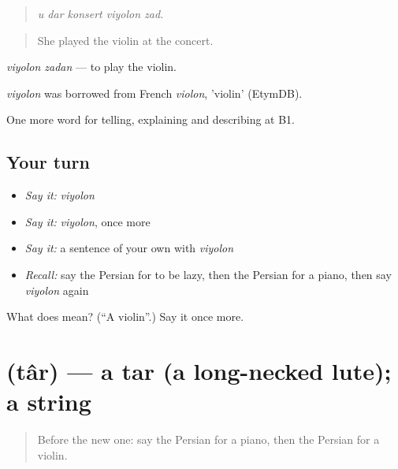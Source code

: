 \begin{quote}
\emph{u dar konsert viyolon zad.}
\end{quote}

\begin{quote}
She played the violin at the concert.
\end{quote}

\emph{viyolon zadan} — to play the violin.

\begin{cousinweb}
\emph{viyolon} was borrowed from French \emph{violon}, 'violin' (EtymDB).
\end{cousinweb}

\begin{grammarlens}[title={What you've built}]
One more word for telling, explaining and describing at B1.
\end{grammarlens}

\subsection*{Your turn}
\begin{itemize}
\raggedright
  \item \emph{Say it:} \emph{viyolon}
  \item \emph{Say it:} \emph{viyolon}, once more
  \item \emph{Say it:} a sentence of your own with \emph{viyolon}
  \item \emph{Recall:} say the Persian for to be lazy, then the Persian for a piano, then say \emph{viyolon} again
\end{itemize}

\begin{tcolorbox}[breakable,colback=teal!4,colframe=teal!35!black,title={Before you move on}]
What does  mean? (\textquotedblleft{}A violin\textquotedblright{}.) Say it once more.
\end{tcolorbox}
\section[\texorpdfstring{\fa{تار} (târ)}{تار (târ)}]{ (târ) — a tar (a long-necked lute); a string}

\label{lesson:FA-C517-tar}



\begin{quote}
Before the new one: say the Persian for a piano, then the Persian for a violin.
\end{quote}

